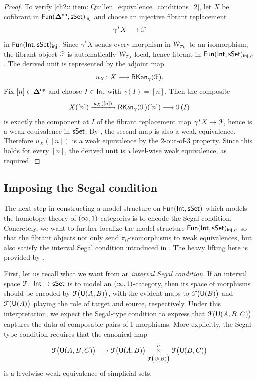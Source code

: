 \begin{proof}
    To verify \eqref{ch2:: item: Quillen_equivalence_conditions_2}, let $X$ be cofibrant in $\operatorname{\sf Fun}(\mathbf\Delta^{\mathsf{op}},\operatorname{\sf sSet})_{\mathsf{inj}}$ and choose an injective fibrant replacement
    \[
      \gamma^*X \longrightarrow \mathcal F
    \]
    in $\operatorname{\sf Fun}(\operatorname{\mathsf{Int}},\operatorname{\sf sSet})_{\mathsf{inj}}$. Since $\gamma^*X$ sends every morphism in $\mathcal W_{\pi_0}$ to an isomorphism, the fibrant object $\mathcal F$ is automatically $\mathcal W_{\pi_0}$-local, hence fibrant in $\operatorname{\sf Fun}(\operatorname{\mathsf{Int}},\operatorname{\sf sSet})_{\mathsf{inj},h}$. The derived unit is represented by the adjoint map
    \[
      u_X\colon X \longrightarrow \operatorname{{\sf RKan}}_\gamma(\mathcal F).
    \]
    Fix $[n]\in \mathbf\Delta^{\mathsf{op}}$ and choose $I\in\operatorname{\mathsf{Int}}$ with $\gamma(I)=[n]$. Then the composite
    \[
      X([n]) \xrightarrow{\,u_X([n])\,} \operatorname{{\sf RKan}}_\gamma(\mathcal F)([n]) \longrightarrow \mathcal F(I)
    \]
    is exactly the component at $I$ of the fibrant replacement map $\gamma^*X\to\mathcal F$, hence is a weak equivalence in $\operatorname{\sf sSet}$. By , the second map is also a weak equivalence. Therefore $u_X([n])$ is a weak equivalence by the $2$-out-of-$3$ property. Since this holds for every $[n]$, the derived unit is a level-wise weak equivalence, as required.
\end{proof}




\subsection{Imposing the Segal condition}
\smallskip

The next step in constructing a model structure on $\operatorname{{\sf Fun}}(\operatorname{\mathsf{Int}},\operatorname{\sf sSet})$ which
models the homotopy theory of $(\operatorname{\infty},1)$-categories is to encode the Segal
condition. Concretely, we want to further localize the model structure
$\operatorname{{\sf Fun}}(\operatorname{\mathsf{Int}},\operatorname{\sf sSet})_{\mathsf{inj},h}$ so that the fibrant objects not only send
$\pi_0$-isomorphisms to weak equivalences, but also satisfy the interval Segal
condition introduced in . The heavy lifting
here is provided by .

First, let us recall what we want from an \emph{interval Segal condition}. If an
interval space $\mathcal F\colon \operatorname{\mathsf{Int}} \to \operatorname{\sf sSet}$ is to model an $(\operatorname{\infty},1)$-category,
then its space of morphisms should be encoded by $\mathcal F\big(\mathsf U(A,B)\big)$, with
the evident maps to $\mathcal F\big(\mathsf U(B)\big)$ and $\mathcal F\big(\mathsf U(A)\big)$ playing the
role of target and source, respectively. Under this interpretation, we expect
the Segal-type condition to express that $\mathcal F\big(\mathsf U(A,B,C)\big)$ captures the
data of composable pairs of 1-morphisms. More explicitly, the Segal-type
condition requires that the canonical map
\begin{equation}
    \mathcal F\big(\mathsf U(A,B,C)\big)
      \longrightarrow
      \mathcal F\big(\mathsf U(A,B)\big)
        \underset{\mathcal F\big(\mathsf U(B)\big)}{\overset{h}{\times}}
      \mathcal F\big(\mathsf U(B,C)\big)
\end{equation}
is a levelwise weak equivalence of simplicial sets.

